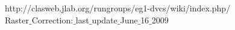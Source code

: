  http://clasweb.jlab.org/rungroups/eg1-dvcs/wiki/index.php/\\Raster$\_$Correction:$\_$last$\_$update$\_$June$\_$16$\_$2009







